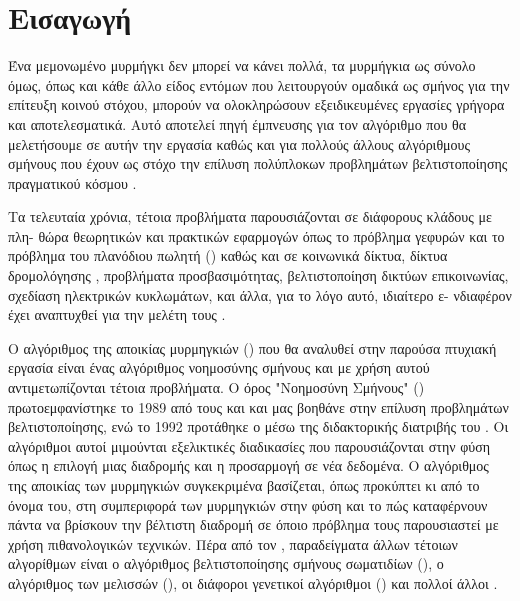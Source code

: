 \section{Εισαγωγή}
Ένα μεμονωμένο μυρμήγκι δεν μπορεί να κάνει πολλά, τα μυρμήγκια ως σύνολο όμως, όπως και κάθε άλλο είδος εντόμων που λειτουργούν ομαδικά ως σμήνος για την επίτευξη κοινού στόχου, μπορούν να ολοκληρώσουν εξειδικευμένες εργασίες γρήγορα και αποτελεσματικά. Αυτό αποτελεί πηγή έμπνευσης για τον αλγόριθμο που θα μελετήσουμε σε αυτήν την εργασία καθώς και για πολλούς άλλους αλγόριθμους σμήνους που έχουν ως στόχο την επίλυση πολύπλοκων προβλημάτων βελτιστοποίησης πραγματικού κόσμου \cite{dorigo2004ant}. 

Τα τελευταία χρόνια, τέτοια προβλήματα παρουσιάζονται σε διάφορους κλάδους με πλη- θώρα θεωρητικών και πρακτικών εφαρμογών όπως το πρόβλημα γεφυρών και το πρόβλημα του πλανόδιου πωλητή () καθώς και σε κοινωνικά δίκτυα, δίκτυα δρομολόγησης \cite{gkertsis2023thewria}, προβλήματα προσβασιμότητας, βελτιστοποίηση δικτύων επικοινωνίας, σχεδίαση ηλεκτρικών κυκλωμάτων, και άλλα, για το λόγο αυτό, ιδιαίτερο ε- νδιαφέρον έχει αναπτυχθεί για την μελέτη τους \cite{manwlopoulos2014thewria}.

Ο αλγόριθμος της αποικίας μυρμηγκιών () που θα αναλυθεί στην παρούσα πτυχιακή εργασία είναι ένας αλγόριθμος νοημοσύνης σμήνους και με χρήση αυτού αντιμετωπίζονται τέτοια προβλήματα. Ο όρος "Νοημοσύνη Σμήνους" () πρωτοεμφανίστηκε το 1989 από τους  και  \cite{10.1007/978-3-642-58069-7_38} και μας βοηθάνε στην επίλυση προβλημάτων βελτιστοποίησης, ενώ το 1992 προτάθηκε ο  μέσω της διδακτορικής διατριβής του . Οι αλγόριθμοι αυτοί μιμούνται εξελικτικές διαδικασίες που παρουσιάζονται στην φύση όπως η επιλογή μιας διαδρομής και η προσαρμογή σε νέα δεδομένα. Ο αλγόριθμος της αποικίας των μυρμηγκιών συγκεκριμένα βασίζεται, όπως προκύπτει κι από το όνομα του, στη συμπεριφορά των μυρμηγκιών στην φύση και το πώς καταφέρνουν πάντα να βρίσκουν την βέλτιστη διαδρομή σε όποιο πρόβλημα τους παρουσιαστεί με χρήση πιθανολογικών τεχνικών. Πέρα από τον , παραδείγματα άλλων τέτοιων αλγορίθμων είναι ο αλγόριθμος βελτιστοποίησης σμήνους σωματιδίων (), ο αλγόριθμος των μελισσών (), οι διάφοροι γενετικοί αλγόριθμοι () και πολλοί άλλοι \cite{mavrovouniotis2017survey}.

